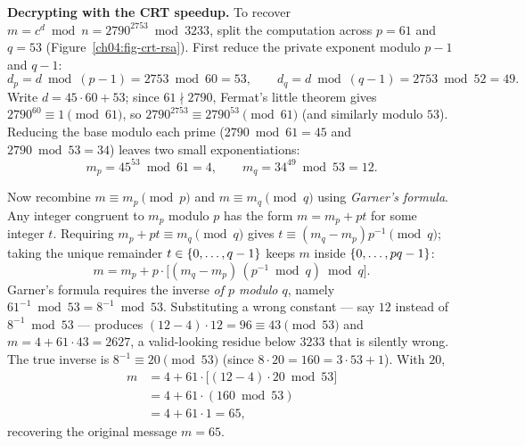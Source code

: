 \textbf{Decrypting with the CRT speedup.} To recover $m = c^d \bmod n = 2790^{2753} \bmod 3233$,
split the computation across $p = 61$ and $q = 53$ (Figure~\ref{ch04:fig-crt-rsa}). First reduce the
private exponent modulo $p - 1$ and $q - 1$:
\[
  d_p = d \bmod (p-1) = 2753 \bmod 60 = 53, \qquad
  d_q = d \bmod (q-1) = 2753 \bmod 52 = 49.
\]
Write $d = 45 \cdot 60 + 53$; since $61 \nmid 2790$, Fermat's little theorem gives
$2790^{60} \equiv 1 \pmod{61}$, so $2790^{2753} \equiv 2790^{53} \pmod{61}$ (and similarly modulo
$53$). Reducing the base modulo each prime ($2790 \bmod 61 = 45$ and $2790 \bmod 53 = 34$) leaves two
small exponentiations:
\[
  m_p = 45^{53} \bmod 61 = 4, \qquad m_q = 34^{49} \bmod 53 = 12.
\]

Now recombine $m \equiv m_p \pmod p$ and $m \equiv m_q \pmod q$ using \emph{Garner's formula}. Any
integer congruent to $m_p$ modulo $p$ has the form $m = m_p + p t$ for some integer $t$. Requiring
$m_p + p t \equiv m_q \pmod q$ gives $t \equiv (m_q - m_p) p^{-1} \pmod q$; taking the unique
remainder $t \in \{0, \dots, q-1\}$ keeps $m$ inside $\{0, \dots, pq - 1\}$:
\[
  m = m_p + p \cdot \bigl[(m_q - m_p)\,(p^{-1} \bmod q) \bmod q\bigr].
\]
Garner's formula requires the inverse \emph{of $p$ modulo $q$}, namely
$61^{-1} \bmod 53 = 8^{-1} \bmod 53$. Substituting a wrong constant --- say $12$ instead of
$8^{-1} \bmod 53$ --- produces $(12 - 4) \cdot 12 = 96 \equiv 43 \pmod{53}$ and
$m = 4 + 61 \cdot 43 = 2627$, a valid-looking residue below $3233$ that is silently wrong. The true
inverse is $8^{-1} \equiv 20 \pmod{53}$ (since $8 \cdot 20 = 160 = 3 \cdot 53 + 1$). With $20$,
\begin{align*}
  m &= 4 + 61 \cdot \bigl[(12 - 4) \cdot 20 \bmod 53\bigr] \\
    &= 4 + 61 \cdot (160 \bmod 53) \\
    &= 4 + 61 \cdot 1 = 65,
\end{align*}
recovering the original message $m = 65$.

